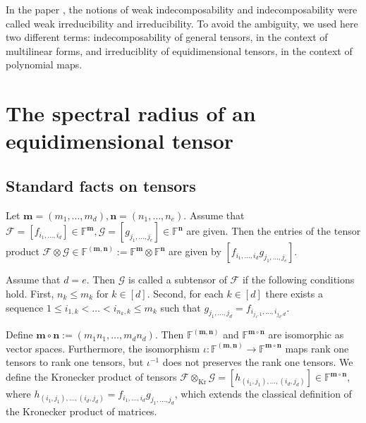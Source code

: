 \documentclass{amsart}
\newcommand{\F}{\mathbb{F}}
\newcommand{\m}{\mathbf{m}}
\newcommand{\n}{\mathbf{n}}
\newcommand{\0}{\mathbf{0}}
\newcommand{\1}{\mathbf{1}}
\newcommand{\cF}{\mathcal{F}}
\newcommand{\cG}{\mathcal{G}}
\newcommand{\Kron}{\mathop{\mathrm{Kr}}\nolimits}
\theoremstyle{remark}
\numberwithin{equation}{section} %
\renewcommand{\leq}{\leqslant}
\renewcommand{\le}{\leqslant}
\begin{document}
 In the paper \cite{FGH}, the notions of weak indecomposability and indecomposability were called weak irreducibility
 and irreducibility.  To avoid the ambiguity, we used here two different terms: indecomposability of general
 tensors, in the context of multilinear forms, and irreduciblity of equidimensional tensors, in the context of polynomial maps.

 \section{The spectral radius of an equidimensional tensor}\label{sec:varspecrad}
 \subsection{Standard facts on tensors}
 Let $\m=(m_1,\ldots,m_d), \n=(n_1,\ldots,n_e)$.
  Assume that $\cF=[f_{i_1,\ldots,i_d}]\in\F^{\m},\cG=[g_{j_1,\ldots,j_e}]\in \F^{\n}$ are given.  Then the entries of the tensor product $\cF\otimes\cG\in\F^{(\m,\n)}:=\F^{\m}\otimes \F^{\n}$ are given by $ [f_{i_1,\ldots,i_d}g_{j_1,\ldots,j_e}]$.
  
Assume that $d=e$.  Then $\cG$ is called a subtensor of $\cF$ if the following conditions hold. First, $n_k\le m_k$ for $k\in [d]$.  Second,   for each $k\in[d]$ there exists a sequence 
$1\leq i_{1,k}<\ldots<i_{n_k,k}\leq m_k$ such that $g_{j_1,\ldots,j_d}=f_{i_{j_1,1},\ldots,i_{j_d,d}}$.
%

Define $\m\circ\n:=(m_1n_1,\ldots,m_dn_d)$.
 Then $\F^{(\m,\n)}$ and $\F^{\m\circ\n}$ are isomorphic as vector spaces.  Furthermore, the isomorphism $\iota:\F^{(\m,\n)}\to\F^{\m\circ\n}$
 maps rank one tensors to rank one tensors, but $\iota^{-1}$ does not preserves the rank one tensors.  
%
We define the Kronecker product of tensors $\cF\otimes_{\Kron}\cG=[h_{(i_1,j_1),\ldots,(i_d,j_d)}]\in \F^{\m\circ\n}$, where $h_{(i_1,j_1),\ldots,(i_d,j_d)}=f_{i_1,\ldots,i_d}g_{j_1,\ldots,j_d}$, which extends the classical definition of the Kronecker product of matrices.
\end{document}
